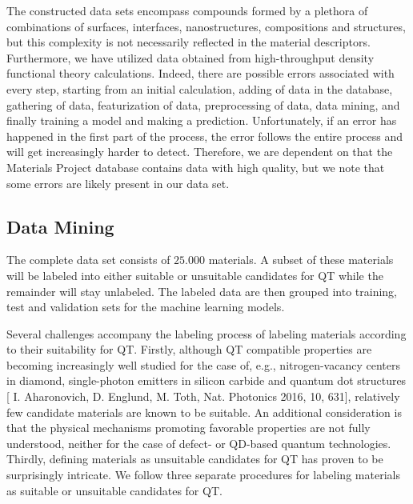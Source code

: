 \documentclass[superscriptaddress,unsortedaddress,
 amsmath,amssymb,
 aps,
]{revtex4-2}
\begin{document}
The constructed data sets encompass compounds formed by a plethora of combinations of surfaces, interfaces, nanostructures, compositions and structures, but this complexity is not necessarily reflected in the material descriptors. 
Furthermore, we have utilized data obtained from high-throughput density functional theory calculations. Indeed, there are possible errors associated with every step, starting from an initial calculation, adding of data in the database, gathering of data, featurization of data, preprocessing of data, data mining, and finally training a model and making a prediction. Unfortunately, if an error has happened in the first part of the process, the error follows the entire process and will get increasingly harder to detect. Therefore, we are dependent on that the Materials Project database contains data with high quality, but we note that some errors are likely present in our data set. 

\subsection*{Data Mining}
The complete data set consists of $25.000$ materials. A subset of these materials will be labeled into either suitable or unsuitable candidates for QT while the remainder will stay unlabeled. The labeled data are then grouped into training, test and validation sets for the machine learning models. 

Several challenges accompany the labeling process of labeling materials according to their suitability for QT. 
Firstly, although QT compatible properties are becoming increasingly well studied for the case of, e.g., nitrogen-vacancy centers in diamond, single-photon emitters in silicon carbide and quantum dot structures \cite{Bathen2021}[ I. Aharonovich, D. Englund, M. Toth, Nat. Photonics 2016, 10, 631], relatively few candidate materials are known to be suitable. An additional consideration is that the physical mechanisms promoting favorable properties are not fully understood, neither for the case of defect- or QD-based quantum technologies. Thirdly, defining materials as unsuitable candidates for QT has proven to be surprisingly intricate. 
We follow three separate procedures for labeling materials as suitable or unsuitable candidates for QT. 
\end{document}
